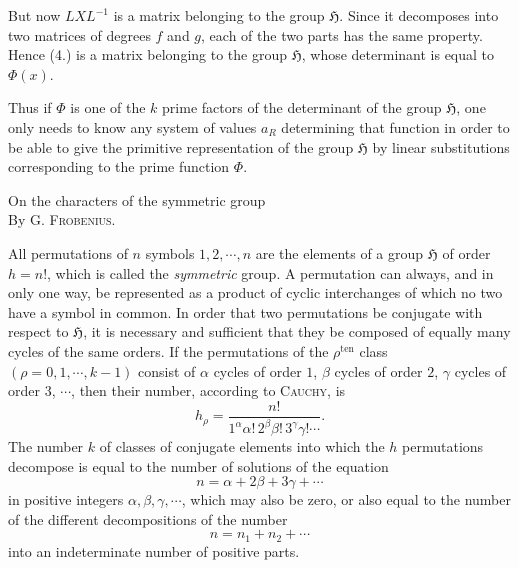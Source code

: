\documentclass[11pt]{article}
\newcommand{\Hgr}{\mathfrak{H}}
\newcommand{\ten}{\mathrm{ten}}
\newcommand{\frobtitle}[1]{\begin{center}{\Large #1}\\[0.75em]By G. \textsc{Frobenius}.\end{center}\vspace{0.5em}}
\begin{document}
But now $LXL^{-1}$ is a matrix belonging to the group $\Hgr$. Since it decomposes into two matrices of degrees $f$ and $g$, each of the two parts has the same property. Hence (4.) is a matrix belonging to the group $\Hgr$, whose determinant is equal to $\Phi(x)$.

Thus if $\Phi$ is one of the $k$ prime factors of the determinant of the group $\Hgr$, one only needs to know any system of values $a_R$ determining that function in order to be able to give the primitive representation of the group $\Hgr$ by linear substitutions corresponding to the prime function $\Phi$.

\clearpage

\frobtitle{On the characters of the symmetric group}

All permutations of $n$ symbols $1,2,\cdots,n$ are the elements of a group $\Hgr$ of order $h=n!$, which is called the \emph{symmetric} group. A permutation can always, and in only one way, be represented as a product of cyclic interchanges of which no two have a symbol in common. In order that two permutations be conjugate with respect to $\Hgr$, it is necessary and sufficient that they be composed of equally many cycles of the same orders. If the permutations of the $\rho^{\ten}$ class $(\rho=0,1,\cdots,k-1)$ consist of $\alpha$ cycles of order $1$, $\beta$ cycles of order $2$, $\gamma$ cycles of order $3$, $\cdots$, then their number, according to \textsc{Cauchy}, is
\begin{equation}\tag{1.}
 h_\rho=\frac{n!}{1^\alpha\alpha!\,2^\beta\beta!\,3^\gamma\gamma!\cdots}.
\end{equation}
The number $k$ of classes of conjugate elements into which the $h$ permutations decompose is equal to the number of solutions of the equation
\begin{equation}\tag{2.}
 n=\alpha+2\beta+3\gamma+\cdots
\end{equation}
in positive integers $\alpha,\beta,\gamma,\cdots$, which may also be zero, or also equal to the number of the different decompositions of the number
\begin{equation}\tag{3.}
 n=n_1+n_2+\cdots
\end{equation}
into an indeterminate number of positive parts.
\end{document}
